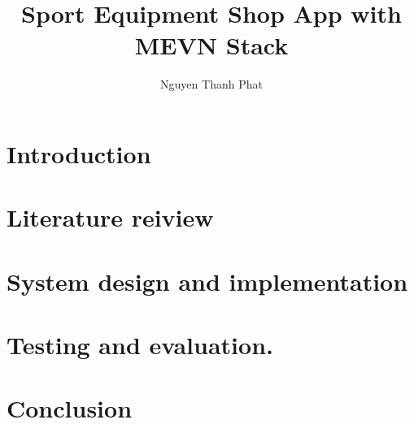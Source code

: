 \documentclass[a4paper,12pt,oneside]{report}
\title{Sport Equipment Shop App with MEVN Stack}
\author{Nguyen Thanh Phat}
\begin{document}



\tableofcontents
\listoffigures
\listoftables






\clearpage
{}
\chapter{Introduction}


\chapter{Literature reiview}


% 

\chapter{System design and implementation}


\chapter{Testing and evaluation.}


\chapter{Conclusion}


{}

\end{document}
